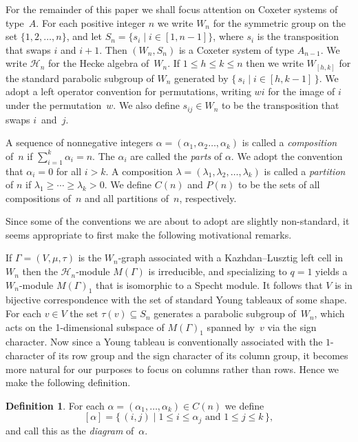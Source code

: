 \documentclass[10pt]{amsart}
\theoremstyle{definition}
\newtheorem{defi}[theo]{Definition}
\begin{document}
For the remainder of this paper we shall focus attention on Coxeter systems
of type~$A$. For each positive integer $n$ we write $W_n$ for the symmetric
group on the set $\{1,2,\ldots,n\}$, and let $S_n=\{s_i\mid i \in [1,n-1]\}$,
where $s_i$ is the transposition that swaps $i$ and $i+1$. Then $(W_n,S_n)$
is a Coxeter system of type $A_{n-1}$. We write $\mathcal{H}_n$ for the
Hecke algebra of~$W_n$. If $1\leqslant h\leqslant k\leqslant n$ then we write
$W_{[h,k]}$ for the standard parabolic subgroup of $W_n$ generated by
$\{\,s_i\mid i\in[h,k-1]\,\}$. We adopt a left operator convention for permutations,
writing $wi$ for the image of $i$ under the permutation~$w$. We also define
$s_{ij}\in W_n$ to be the transposition that swaps $i$~and~$j$.

A sequence of nonnegative integers $\alpha =
(\alpha_{1},\alpha_{2} \ldots, \alpha_{k})$ is called a \emph{composition}
of~$n$ if $\sum_{i=1}^k\alpha_i=n$. The $\alpha_i$ are called the \emph{parts}
of $\alpha$. We adopt the convention that $\alpha_i=0$ for all $i>k$.
A composition $\lambda = (\lambda_1,\lambda_2,\ldots,\lambda_k)$ is called a
\emph{partition} of $n$ if $\lambda_{1} \ge \cdots \ge \lambda_{k}>0$.
We define $C(n)$ and $P(n)$ to be the sets
of all compositions of~$n$ and all partitions of~$n$, respectively.

Since some of the conventions we are about to adopt are slightly non-standard, it seems
appropriate to first make the following motivational remarks.

If $\Gamma=(V,\mu,\tau)$ is the $W_n\!$-graph associated with a Kazhdan--Lusztig
left cell in~$W_n$ then the $\mathcal{H}_n$-module $M(\Gamma)$ is irreducible,
and specializing to $q=1$ yields a $W_n$-module $M(\Gamma)_1$ that is isomorphic
to a Specht module. It follows that $V$ is in bijective correspondence with
the set of standard Young tableaux of some shape. For each $v\in V$ the set
$\tau(v)\subseteq S_n$ generates a parabolic subgroup of~$W_n$, which acts on the
1-dimensional subspace of $M(\Gamma)_1$ spanned by~$v$ via the sign character.
Now since a Young tableau is conventionally associated with the $1$-character of its row
group and the sign character of its column group, it becomes more natural for
our purposes to focus on columns rather than rows. Hence we make
the following definition.

\begin{defi}\label{diagram}
For each
$\alpha=(\alpha_{1},\ldots,\alpha_{k})\in C(n)$ we define
\[[\alpha]=
\{\,(i,j)\mid1\leqslant i\leqslant\alpha_{j}\text{ and }1\leqslant
j\leqslant k\,\},
\]
and call this as the \emph{diagram} of~$\alpha$.
\end{defi}
\end{document}
